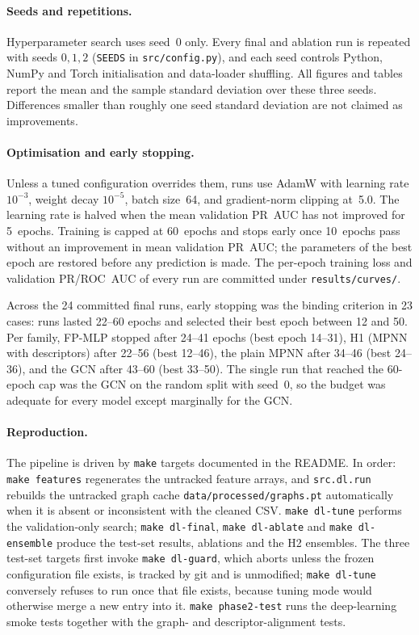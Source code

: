 \paragraph{Seeds and repetitions.}
Hyperparameter search uses seed~0 only. Every final and ablation run is repeated with seeds $0, 1, 2$ (\texttt{SEEDS} in \texttt{src/config.py}), and each seed controls Python, NumPy and Torch initialisation and data-loader shuffling. All figures and tables report the mean and the sample standard deviation over these three seeds. Differences smaller than roughly one seed standard deviation are not claimed as improvements.

\paragraph{Optimisation and early stopping.}
Unless a tuned configuration overrides them, runs use AdamW with learning rate $10^{-3}$, weight decay $10^{-5}$, batch size~64, and gradient-norm clipping at~5.0. The learning rate is halved when the mean validation PR~AUC has not improved for 5~epochs. Training is capped at 60~epochs and stops early once 10~epochs pass without an improvement in mean validation PR~AUC; the parameters of the best epoch are restored before any prediction is made. The per-epoch training loss and validation PR/ROC~AUC of every run are committed under \texttt{results/curves/}.

Across the 24 committed final runs, early stopping was the binding criterion in 23 cases: runs lasted 22--60 epochs and selected their best epoch between 12 and 50. Per family, FP-MLP stopped after 24--41 epochs (best epoch 14--31), H1 (MPNN with descriptors) after 22--56 (best 12--46), the plain MPNN after 34--46 (best 24--36), and the GCN after 43--60 (best 33--50). The single run that reached the 60-epoch cap was the GCN on the random split with seed~0, so the budget was adequate for every model except marginally for the GCN.

\paragraph{Reproduction.}
The pipeline is driven by \texttt{make} targets documented in the README. In order: \texttt{make features} regenerates the untracked feature arrays, and \texttt{src.dl.run} rebuilds the untracked graph cache \texttt{data/processed/graphs.pt} automatically when it is absent or inconsistent with the cleaned CSV. \texttt{make dl-tune} performs the validation-only search; \texttt{make dl-final}, \texttt{make dl-ablate} and \texttt{make dl-ensemble} produce the test-set results, ablations and the H2 ensembles. The three test-set targets first invoke \texttt{make dl-guard}, which aborts unless the frozen configuration file exists, is tracked by git and is unmodified; \texttt{make dl-tune} conversely refuses to run once that file exists, because tuning mode would otherwise merge a new entry into it. \texttt{make phase2-test} runs the deep-learning smoke tests together with the graph- and descriptor-alignment tests.

